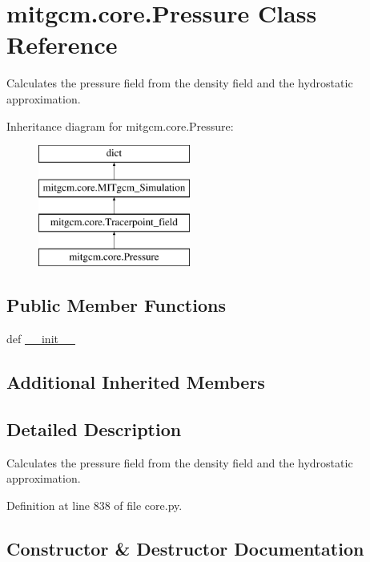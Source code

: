 \hypertarget{classmitgcm_1_1core_1_1Pressure}{}\section{mitgcm.\+core.\+Pressure Class Reference}
\label{classmitgcm_1_1core_1_1Pressure}


Calculates the pressure field from the density field and the hydrostatic approximation.  


Inheritance diagram for mitgcm.\+core.\+Pressure\+:\begin{figure}[H]
\begin{center}
\leavevmode
\includegraphics[height=4.000000cm]{classmitgcm_1_1core_1_1Pressure}
\end{center}
\end{figure}
\subsection*{Public Member Functions}
\begin{DoxyCompactItemize}
\item 
def \hyperlink{classmitgcm_1_1core_1_1Pressure_a015248e433a994b90e08ec3123687ec8}{\+\_\+\+\_\+init\+\_\+\+\_\+}
\end{DoxyCompactItemize}
\subsection*{Additional Inherited Members}


\subsection{Detailed Description}
Calculates the pressure field from the density field and the hydrostatic approximation. 



Definition at line 838 of file core.\+py.



\subsection{Constructor \& Destructor Documentation}
\hypertarget{classmitgcm_1_1core_1_1Pressure_a015248e433a994b90e08ec3123687ec8}{}
